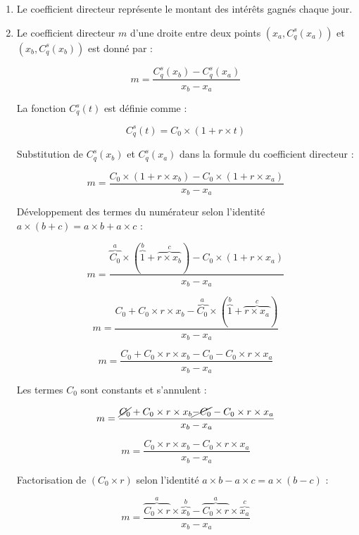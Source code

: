 \documentclass{article}
\begin{document}
\begin{enumerate}[label=\textbf{R1.\arabic*}]
	\item Le coefficient directeur représente le montant des intérêts gagnés chaque jour.
	      
	\item Le coefficient directeur \( m \) d'une droite entre deux points \((x_a, C_q^s(x_a))\) et \((x_b, C_q^s(x_b))\) est donné par :
	          
	      \[
	      	m = \frac{C_q^s(x_b) - C_q^s(x_a)}{x_b - x_a}
	      \]
	          
	      La fonction \( C_q^s(t) \) est définie comme :
	          
	      \[
	      	C_q^s(t) = C_0 \times \left(1 + r \times t\right)
	      \]
	              
	      Substitution de \( C_q^s(x_b) \) et \( C_q^s(x_a) \) dans la formule du coefficient directeur :
	          
	      \[
	      	m = \frac{C_0 \times \left(1 + r \times x_b\right) - C_0 \times \left(1 + r \times x_a\right)}{x_b - x_a}
	      \]
	          
	      Développement des termes du numérateur selon l'identité $a \times (b + c) = a \times b + a \times c$ :
	      
	      \[
	      	m = \frac{\overset{a}{\overbrace{C_0}} \times (\overset{b}{\overbrace{1}} + \overset{c}{\overbrace{r \times x_b}}) - C_0 \times (1 + r \times x_a)}{x_b - x_a}
	      \]
	      
	      \[
	      	m = \frac{C_0 + C_0 \times r \times x_b - \overset{a}{\overbrace{C_0}} \times (\overset{b}{\overbrace{1}} + \overset{c}{\overbrace{r \times x_a}})}{x_b - x_a}
	      \]
	          
	      \[
	      	m = \frac{C_0 + C_0 \times r \times x_b - C_0 - C_0 \times r \times x_a}{x_b - x_a}
	      \]
	          
	      Les termes \( C_0 \) sont constants et s'annulent :
	      
	      \[
	      	m = \frac{\cancel{C_0} + C_0 \times r \times x_b \cancel{- C_0} - C_0 \times r \times x_a}{x_b - x_a}
	      \]
	          
	      \[
	      	m = \frac{C_0 \times r \times x_b - C_0 \times r \times x_a}{x_b - x_a}
	      \]
	          
	      Factorisation de $(C_0 \times r)$ selon l'identité $a \times b - a \times c = a \times (b-c)$ :
	      
	      \[
	      	m = \frac{\overset{a}{\overbrace{C_0 \times r}} \times \overset{b}{\overbrace{x_b}} - \overset{a}{\overbrace{C_0 \times r}} \times \overset{c}{\overbrace{x_a}}}{x_b - x_a}
	      \]
	          

\end{enumerate}
\end{document}
